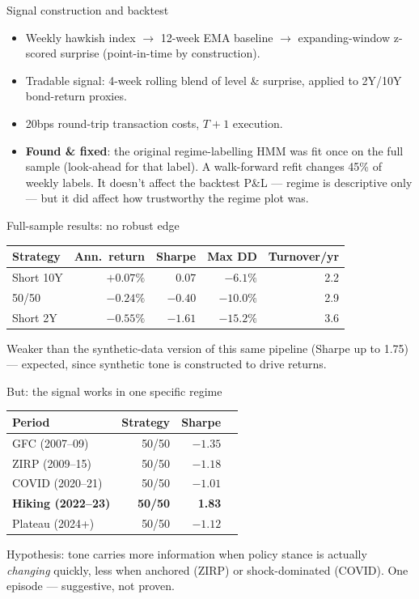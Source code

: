 \documentclass[11pt]{beamer}
\begin{document}
\begin{frame}{Signal construction and backtest}
\begin{itemize}
  \item Weekly hawkish index $\rightarrow$ 12-week EMA baseline
    $\rightarrow$ expanding-window z-scored surprise (point-in-time by
    construction).
  \item Tradable signal: 4-week rolling blend of level \& surprise,
    applied to 2Y/10Y bond-return proxies.
  \item 20bps round-trip transaction costs, $T{+}1$ execution.
  \item \textbf{Found \& fixed}: the original regime-labelling HMM was fit
    once on the full sample (look-ahead for that label). A walk-forward
    refit changes 45\% of weekly labels. It doesn't affect the backtest
    P\&L --- regime is descriptive only --- but it did affect how
    trustworthy the regime plot was.
\end{itemize}
\end{frame}

\begin{frame}{Full-sample results: no robust edge}
\centering
\begin{tabular}{lrrrr}
\toprule
Strategy & Ann.\ return & Sharpe & Max DD & Turnover/yr \\
\midrule
Short 10Y & $+0.07\%$ & $0.07$  & $-6.1\%$  & 2.2 \\
50/50     & $-0.24\%$ & $-0.40$ & $-10.0\%$ & 2.9 \\
Short 2Y  & $-0.55\%$ & $-1.61$ & $-15.2\%$ & 3.6 \\
\bottomrule
\end{tabular}
\vspace{1em}

Weaker than the synthetic-data version of this same pipeline (Sharpe up
to 1.75) --- expected, since synthetic tone is constructed to drive
returns.
\end{frame}

\begin{frame}{But: the signal works in one specific regime}
\centering
\begin{tabular}{lrrr}
\toprule
Period & Strategy & Sharpe \\
\midrule
GFC (2007--09)   & 50/50 & $-1.35$ \\
ZIRP (2009--15)  & 50/50 & $-1.18$ \\
COVID (2020--21) & 50/50 & $-1.01$ \\
\textbf{Hiking (2022--23)} & \textbf{50/50} & \textbf{1.83} \\
Plateau (2024+)  & 50/50 & $-1.12$ \\
\bottomrule
\end{tabular}
\vspace{1em}

Hypothesis: tone carries more information when policy stance is actually
\emph{changing} quickly, less when anchored (ZIRP) or shock-dominated
(COVID). One episode --- suggestive, not proven.
\end{frame}
\end{document}
